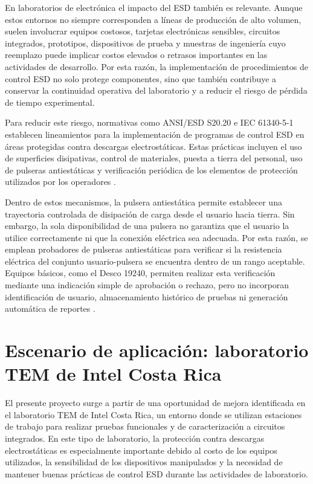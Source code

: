 En laboratorios de electrónica el impacto del ESD también es relevante. 
Aunque estos entornos no siempre corresponden a 
líneas de producción de alto volumen, suelen involucrar equipos costosos, tarjetas electrónicas 
sensibles, circuitos integrados, prototipos, dispositivos de prueba y muestras de ingeniería cuyo reemplazo 
puede implicar costos elevados o retrasos importantes en las actividades de desarrollo. 
Por esta razón, la implementación de procedimientos de control ESD no solo protege componentes, 
sino que también contribuye a conservar la continuidad operativa del laboratorio y a 
reducir el riesgo de pérdida de tiempo experimental.

Para reducir este riesgo, normativas como ANSI/ESD S20.20 e IEC 61340-5-1 establecen
lineamientos para la implementación de programas de control ESD en áreas protegidas
contra descargas electrostáticas. Estas prácticas incluyen el uso de superficies disipativas,
control de materiales, puesta a tierra del personal, uso de pulseras antiestáticas y
verificación periódica de los elementos de protección utilizados por los operadores
\cite{ESDAPrinciples2}.

Dentro de estos mecanismos, la pulsera antiestática permite establecer una trayectoria
controlada de disipación de carga desde el usuario hacia tierra. Sin embargo, la sola
disponibilidad de una pulsera no garantiza que el usuario la utilice correctamente ni que
la conexión eléctrica sea adecuada. Por esta razón, se emplean probadores de pulseras
antiestáticas para verificar si la resistencia eléctrica del conjunto usuario-pulsera se
encuentra dentro de un rango aceptable. Equipos básicos, como el Desco 19240, permiten
realizar esta verificación mediante una indicación simple de aprobación o rechazo, pero no
incorporan identificación de usuario, almacenamiento histórico de pruebas ni generación
automática de reportes \cite{Desco_19240}.

\section{Escenario de aplicación: laboratorio TEM de Intel Costa Rica}

El presente proyecto surge a partir de una oportunidad de mejora identificada en el
laboratorio TEM de Intel Costa Rica, un entorno donde se utilizan estaciones de trabajo
para realizar pruebas funcionales y de caracterización a circuitos integrados. En este tipo de laboratorio,
la protección contra descargas electrostáticas es especialmente importante debido al costo
de los equipos utilizados, la sensibilidad de los dispositivos manipulados y la necesidad de
mantener buenas prácticas de control ESD durante las actividades de laboratorio.

